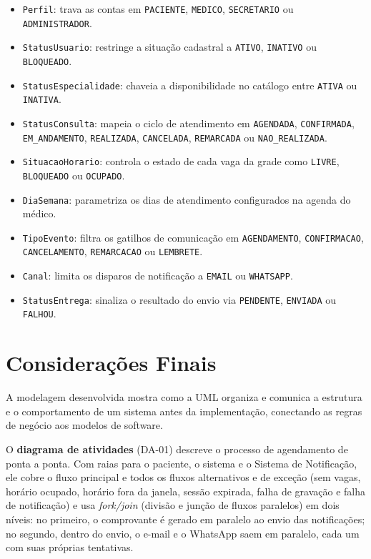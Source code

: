 \documentclass[12pt,a4paper]{article}
\providecommand{\tightlist}{%
  \setlength{\itemsep}{0pt}\setlength{\parskip}{0pt}}
\begin{document}
\begin{itemize}
\tightlist
\item
  \texttt{Perfil}: trava as contas em \texttt{PACIENTE}, \texttt{MEDICO},
  \texttt{SECRETARIO} ou \texttt{ADMINISTRADOR}.
\item
  \texttt{StatusUsuario}: restringe a situação cadastral a
  \texttt{ATIVO}, \texttt{INATIVO} ou \texttt{BLOQUEADO}.
\item
  \texttt{StatusEspecialidade}: chaveia a disponibilidade no catálogo
  entre \texttt{ATIVA} ou \texttt{INATIVA}.
\item
  \texttt{StatusConsulta}: mapeia o ciclo de atendimento em
  \texttt{AGENDADA}, \texttt{CONFIRMADA}, \texttt{EM\_ANDAMENTO},
  \texttt{REALIZADA}, \texttt{CANCELADA}, \texttt{REMARCADA} ou
  \texttt{NAO\_REALIZADA}.
\item
  \texttt{SituacaoHorario}: controla o estado de cada vaga da grade como
  \texttt{LIVRE}, \texttt{BLOQUEADO} ou \texttt{OCUPADO}.
\item
  \texttt{DiaSemana}: parametriza os dias de atendimento configurados na
  agenda do médico.
\item
  \texttt{TipoEvento}: filtra os gatilhos de comunicação em
  \texttt{AGENDAMENTO}, \texttt{CONFIRMACAO}, \texttt{CANCELAMENTO},
  \texttt{REMARCACAO} ou \texttt{LEMBRETE}.
\item
  \texttt{Canal}: limita os disparos de notificação a \texttt{EMAIL} ou
  \texttt{WHATSAPP}.
\item
  \texttt{StatusEntrega}: sinaliza o resultado do envio via
  \texttt{PENDENTE}, \texttt{ENVIADA} ou \texttt{FALHOU}.
\end{itemize}

\section{Considerações Finais}\label{sec:consideracoes}

A modelagem desenvolvida mostra como a UML organiza e comunica a
estrutura e o comportamento de um sistema antes da implementação,
conectando as regras de negócio aos modelos de software.

O \textbf{diagrama de atividades} (DA-01) descreve o processo de
agendamento de ponta a ponta. Com raias para o paciente, o sistema e o
Sistema de Notificação, ele cobre o fluxo principal e todos os fluxos
alternativos e de exceção (sem vagas, horário ocupado, horário fora da
janela, sessão expirada, falha de gravação e falha de notificação) e usa
\emph{fork/join} (divisão e junção de fluxos paralelos) em dois níveis:
no primeiro, o comprovante é gerado em paralelo ao envio das
notificações; no segundo, dentro do envio, o e-mail e o WhatsApp saem em
paralelo, cada um com suas próprias tentativas.
\end{document}
